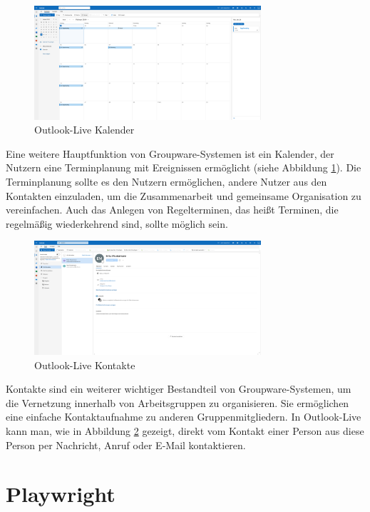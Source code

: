 \begin{figure}[H]
    \centering
    \includegraphics[width=0.75\textwidth]{images/OutlookLive_Calender1.png}
    \caption{Outlook-Live Kalender}
    \label{fig:outlook-live-calender}
\end{figure}

Eine weitere Hauptfunktion von Groupware-Systemen ist ein Kalender, der Nutzern eine Terminplanung mit Ereignissen ermöglicht (siehe Abbildung \ref{fig:outlook-live-calender}).
Die Terminplanung sollte es den Nutzern ermöglichen, andere Nutzer aus den Kontakten einzuladen, um die Zusammenarbeit und gemeinsame Organisation zu vereinfachen.
Auch das Anlegen von Regelterminen, das heißt Terminen, die regelmäßig wiederkehrend sind, sollte möglich sein.

\begin{figure}[H]
    \centering
    \includegraphics[width=0.75\textwidth]{images/OutlookLive_Contacts.png}
    \caption{Outlook-Live Kontakte}
    \label{fig:outlook-live-contacts}
\end{figure}

Kontakte sind ein weiterer wichtiger Bestandteil von Groupware-Systemen, um die Vernetzung innerhalb von Arbeitsgruppen zu organisieren.
Sie ermöglichen eine einfache Kontaktaufnahme zu anderen Gruppenmitgliedern.
In Outlook-Live kann man, wie in Abbildung \ref{fig:outlook-live-contacts} gezeigt, direkt vom Kontakt einer Person aus diese Person per Nachricht, Anruf oder E-Mail kontaktieren.


\section{Playwright}

